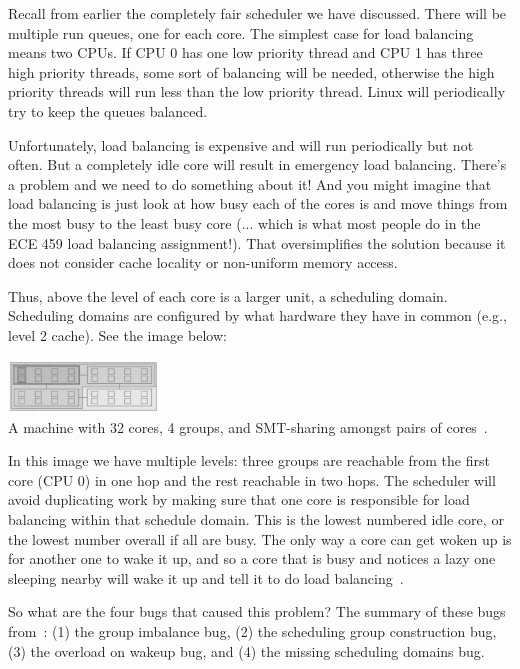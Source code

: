 Recall from earlier the completely fair scheduler we have discussed. There will be multiple run queues, one for each core. The simplest case for load balancing means two CPUs. If CPU 0 has one low priority thread and CPU 1 has three high priority threads, some sort of balancing will be needed, otherwise the high priority threads will run less than the low priority thread. Linux will periodically try to keep the queues balanced.

Unfortunately, load balancing is expensive and will run periodically but not often. But a completely idle core will result in emergency load balancing. There's a problem and we need to do something about it! And you might imagine that load balancing is just look at how busy each of the cores is and move things from the most busy to the least busy core (... which is what most people do in the ECE 459 load balancing assignment!). That oversimplifies the solution because it does not consider cache locality or non-uniform memory access.

Thus, above the level of each core is a larger unit, a scheduling domain. Scheduling domains are configured by what hardware they have in common (e.g., level 2 cache). See the image below:

\begin{center}
	\includegraphics[width=0.3\textwidth]{images/wastedcores.png}\\
	A machine with 32 cores, 4 groups, and SMT-sharing amongst pairs of cores~\cite{wastedcores}.
\end{center}

In this image we have multiple levels: three groups are reachable from the first core (CPU 0) in one hop and the rest reachable in two hops. The scheduler will avoid duplicating work by making sure that one core is responsible for load balancing within that schedule domain. This is the lowest numbered idle core, or the lowest number overall if all are busy. The only way a core can get woken up is for another one to wake it up, and so a core that is busy and notices a lazy one sleeping nearby will wake it up and tell it to do load balancing~\cite{wastedcores2}.

So what are the four bugs that caused this problem? The summary of these bugs from~\cite{wastedcores2}: (1) the group imbalance bug, (2) the scheduling group construction bug, (3) the overload on wakeup bug, and (4) the missing scheduling domains bug.

